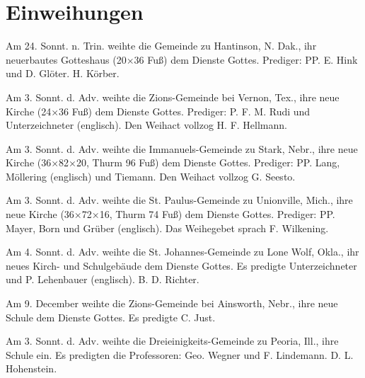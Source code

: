 \chapter[Einweihungen]{Einweihungen}
Am 24. Sonnt. n. Trin. weihte die Gemeinde zu Hantinson, N. Dak., ihr neuerbautes Gotteshaus (20×36 Fuß) dem Dienste Gottes. Prediger: PP. E. Hink und D. Glöter. H. Körber.

Am 3. Sonnt. d. Adv. weihte die Zions-Gemeinde bei Vernon, Tex., ihre neue Kirche (24×36 Fuß) dem Dienste Gottes. Prediger: P. F. M. Rudi und Unterzeichneter (englisch). Den Weihact vollzog H. F. Hellmann.

Am 3. Sonnt. d. Adv. weihte die Immanuels-Gemeinde zu Stark, Nebr., ihre neue Kirche (36×82×20, Thurm 96 Fuß) dem Dienste Gottes. Prediger: PP. Lang, Möllering (englisch) und Tiemann. Den Weihact vollzog G. Seesto.

Am 3. Sonnt. d. Adv. weihte die St. Paulus-Gemeinde zu Unionville, Mich., ihre neue Kirche (36×72×16, Thurm 74 Fuß) dem Dienste Gottes. Prediger: PP. Mayer, Born und Grüber (englisch). Das Weihegebet sprach F. Wilkening.

Am 4. Sonnt. d. Adv. weihte die St. Johannes-Gemeinde zu Lone Wolf, Okla., ihr neues Kirch- und Schulgebäude dem Dienste Gottes. Es predigte Unterzeichneter und P. Lehenbauer (englisch). B. D. Richter.

Am 9. December weihte die Zions-Gemeinde bei Ainsworth, Nebr., ihre neue Schule dem Dienste Gottes. Es predigte C. Just.

Am 3. Sonnt. d. Adv. weihte die Dreieinigkeits-Gemeinde zu Peoria, Ill., ihre Schule ein. Es predigten die Professoren: Geo. Wegner und F. Lindemann. D. L. Hohenstein.
